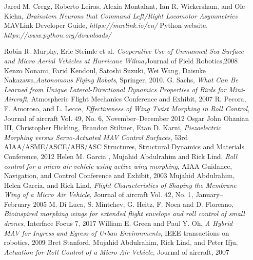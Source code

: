 \documentclass[12pt,a4paper, twoside]{article}
\begin{document}
\newpage
\lhead{ }
\begin{thebibliography}{100}
	
	Jared M. Cregg, Roberto Leiras, Alexia Montalant, Ian R. Wickersham, and Ole Kiehn, \textit{Brainstem Neurons that Command Left/Right Locomotor Asymmetries} 
	 MAVLink Developer Guide, \textit{https://mavlink.io/en/}
	 Python website, \textit{https://www.python.org/downloads/}
	
	 Robin R. Murphy, Eric Steimle et al. \textit{Cooperative Use of Unmanned Sea Surface and Micro Aerial Vehicles at Hurricane Wilma},Journal of Field Robotics,2008
	     Kenzo Nonami, Farid Kendoul, Satoshi Suzuki, Wei Wang, Daisuke Nakazawa,\textit{Autonomous Flying Robots}, Springer, 2010.
	 G. Sachs, \textit{What Can Be Learned from Unique Lateral-Directional Dynamics Properties of Birds for Mini-Aircraft}, Atmospheric Flight Mechanics Conference and Exhibit, 2007
	 R. Pecora, F. Amoroso, and L. Lecce, \textit{Effectiveness of Wing Twist Morphing in Roll Control}, Journal of aircraft Vol. 49, No. 6, November–December 2012
	 Osgar John Ohanian III, Christopher Hickling, Brandon Stiltner, Etan D. Karni, \textit{Piezoelectric Morphing versus Servo-Actuated MAV Control Surfaces}, 53rd AIAA/ASME/ASCE/AHS/ASC Structures, Structural Dynamics and Materials Conference, 2012
	 Helen M. Garcia , Mujahid Abdulrahim and Rick Lind, \textit{Roll control for a micro air vehicle using active wing morphing}, AIAA Guidance, Navigation, and Control Conference and Exhibit, 2003
	 Mujahid Abdulrahim, Helen Garcia, and Rick Lind, \textit{Flight Characteristics of Shaping the Membrane Wing of a Micro Air Vehicle}, Journal of aircraft Vol. 42, No. 1, January–February 2005
	 M. Di Luca, S. Mintchev, G. Heitz, F. Noca and D. Floreano, \textit{Bioinspired morphing wings for extended flight envelope and roll control of small drones}, Interface Focus 7, 2017
	 William E. Green and Paul Y. Oh, \textit{A Hybrid MAV for Ingress and Egress of Urban Environments}, IEEE transactions on robotics, 2009
	 Bret Stanford, Mujahid Abdulrahim, Rick Lind, and Peter Ifju, \textit{Actuation for Roll Control of a Micro Air Vehicle}, Journal of aircraft,  2007

\end{thebibliography}
\end{document}
